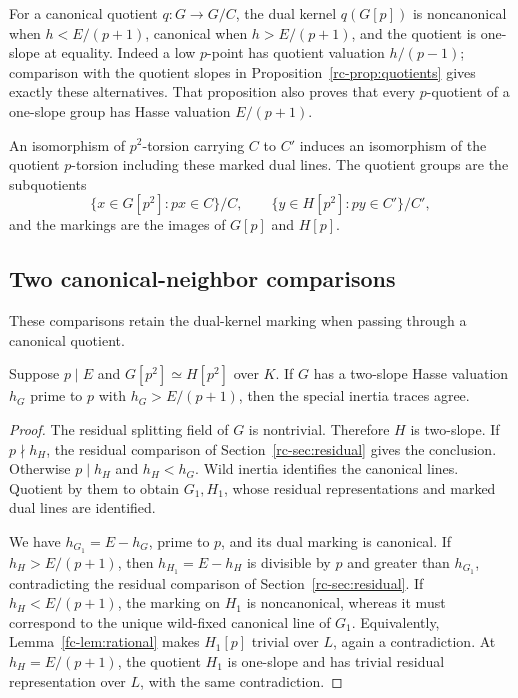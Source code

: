 For a canonical quotient \(q:G\to G/C\), the dual kernel \(q(G[p])\) is noncanonical when \(h<E/(p+1)\), canonical when \(h>E/(p+1)\), and the quotient is one-slope at equality. Indeed a low \(p\)-point has quotient valuation \(h/(p-1)\); comparison with the quotient slopes in Proposition~\ref{rc-prop:quotients} gives exactly these alternatives. That proposition also proves that every \(p\)-quotient of a one-slope group has Hasse valuation \(E/(p+1)\).

An isomorphism of \(p^2\)-torsion carrying \(C\) to \(C'\) induces an isomorphism of the quotient \(p\)-torsion including these marked dual lines. The quotient groups are the subquotients
\[
\{x\in G[p^2]:px\in C\}/C,\qquad
\{y\in H[p^2]:py\in C'\}/C',
\]
and the markings are the images of \(G[p]\) and \(H[p]\).

\subsection{Two canonical-neighbor comparisons}
These comparisons retain the dual-kernel marking when passing through a canonical quotient.


\begin{proposition}\label{fc-prop:central}
Suppose \(p\mid E\) and \(G[p^2]\simeq H[p^2]\) over \(K\).
If \(G\) has a two-slope Hasse valuation \(h_G\) prime to \(p\) with
\(h_G>E/(p+1)\), then the special inertia traces agree.
\end{proposition}
\begin{proof}
The residual splitting field of \(G\) is nontrivial. Therefore \(H\) is
two-slope. If \(p\nmid h_H\), the residual comparison of Section~\ref{rc-sec:residual} gives the conclusion.
Otherwise \(p\mid h_H\) and \(h_H<h_G\). Wild inertia identifies the
canonical lines. Quotient by them to obtain \(G_1,H_1\), whose residual
representations and marked dual lines are identified.

We have \(h_{G_1}=E-h_G\), prime to \(p\), and its dual marking is
canonical. If \(h_H>E/(p+1)\), then \(h_{H_1}=E-h_H\) is divisible by
\(p\) and greater than \(h_{G_1}\), contradicting
the residual comparison of Section~\ref{rc-sec:residual}. If \(h_H<E/(p+1)\), the marking on \(H_1\) is
noncanonical, whereas it must correspond to the unique wild-fixed
canonical line of \(G_1\). Equivalently, Lemma~\ref{fc-lem:rational} makes
\(H_1[p]\) trivial over \(L\), again a contradiction. At
\(h_H=E/(p+1)\), the quotient \(H_1\) is one-slope and has trivial
residual representation over \(L\), with the same contradiction.
\end{proof}

